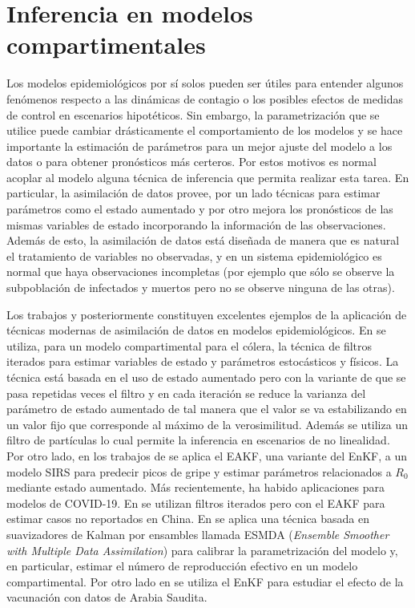 \section{Inferencia en modelos compartimentales}

Los modelos epidemiológicos por sí solos pueden ser útiles para entender algunos fenómenos respecto a las dinámicas de contagio o los posibles efectos de medidas de control en escenarios hipotéticos. Sin embargo, la parametrización que se utilice puede cambiar drásticamente el comportamiento de los modelos y se hace importante la estimación de parámetros para un mejor ajuste del modelo a los datos o para obtener pronósticos más certeros. Por estos motivos es normal acoplar al modelo alguna técnica de inferencia que permita realizar esta tarea. En particular, la asimilación de datos provee, por un lado técnicas para estimar parámetros como el estado aumentado y por otro mejora los pronósticos de las mismas variables de estado incorporando la información de las observaciones. Además de esto, la asimilación de datos está diseñada de manera que es natural el tratamiento de variables no observadas, y en un sistema epidemiológico es normal que haya observaciones incompletas (por ejemplo que sólo se observe la subpoblación de infectados y muertos pero no se observe ninguna de las otras). 

Los trabajos \cite{Ionides2006} y posteriormente \cite{Shaman2012, Shaman2013} constituyen excelentes ejemplos de la aplicación de técnicas modernas de asimilación de datos en modelos epidemiológicos. En \cite{Ionides2006} se utiliza, para un modelo compartimental para el cólera, la técnica de filtros iterados para estimar variables de estado y parámetros estocásticos y físicos. La técnica está basada en el uso de estado aumentado pero con la variante de que se pasa repetidas veces el filtro y en cada iteración se reduce la varianza del parámetro de estado aumentado de tal manera que el valor se va estabilizando en un valor fijo que corresponde al máximo de la verosimilitud. Además se utiliza un filtro de partículas lo cual permite la inferencia en escenarios de no linealidad. Por otro lado, en los trabajos de \cite{Shaman2012, Shaman2013} se aplica el EAKF, una variante del EnKF, a un modelo SIRS para predecir picos de gripe y estimar parámetros relacionados a $R_0$ mediante estado aumentado. Más recientemente, ha habido aplicaciones para modelos de COVID-19. En \cite{Li2020} se utilizan filtros iterados pero con el EAKF para estimar casos no reportados en China. En \cite{Evensen2020} se aplica una técnica basada en suavizadores de Kalman por ensambles llamada ESMDA (\textit{Ensemble Smoother with Multiple Data Assimilation}) para calibrar la parametrización del modelo y, en particular, estimar el número de reproducción efectivo en un modelo compartimental. Por otro lado en \cite{Ghostine2021} se utiliza el EnKF para estudiar el efecto de la vacunación con datos de Arabia Saudita.

